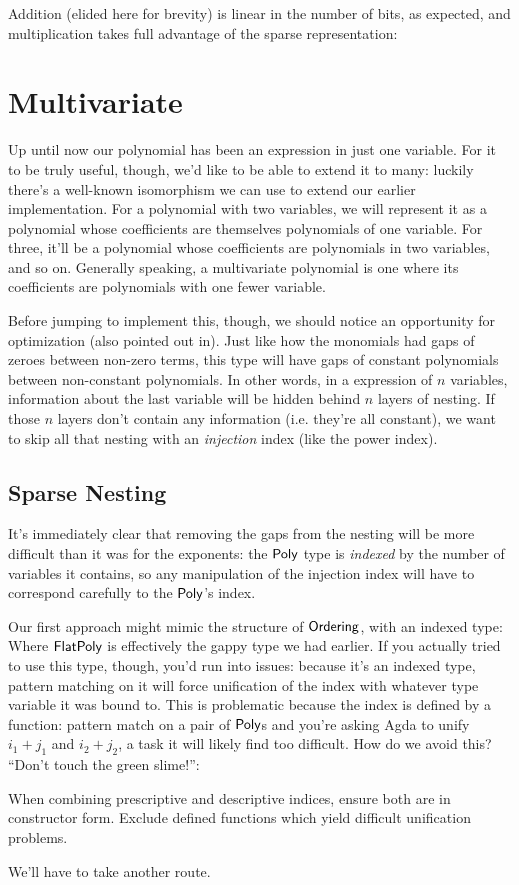 \documentclass[draft, twocolumn]{article}
\theoremstyle{definition}
\theoremstyle{remark}
\begin{document}
Addition (elided here for brevity) is linear in the number of bits, as expected,
and multiplication takes full advantage of the sparse representation:
\section{Multivariate}
Up until now our polynomial has been an expression in just one variable. For it
to be truly useful, though, we'd like to be able to extend it to many: luckily
there's a well-known isomorphism we can use to extend our earlier
implementation. For a polynomial with two variables, we will represent it as a
polynomial whose coefficients are themselves polynomials of one variable. For
three, it'll be a polynomial whose coefficients are polynomials in two
variables, and so on. Generally speaking, a multivariate polynomial is one where
its coefficients are polynomials with one fewer
variable\cite{cheng_functional_2018}.

Before jumping to implement this, though, we should notice an opportunity for
optimization (also pointed out in\cite{hutchison_proving_2005}). Just like how
the monomials had gaps of zeroes between non-zero terms, this type will have
gaps of constant polynomials between non-constant polynomials. In other words,
in a expression of \(n\) variables, information about the last variable will be
hidden behind \(n\) layers of nesting. If those \(n\) layers don't contain any
information (i.e. they're all constant), we want to skip all that nesting with
an \emph{injection} index (like the power index).
\subsection{Sparse Nesting}
It's immediately clear that removing the gaps from the nesting will be more
difficult than it was for the exponents: the \(\AgdaDatatype{Poly}\) type is
\emph{indexed} by the number of variables it contains, so any manipulation of
the injection index will have to correspond carefully to the
\(\AgdaDatatype{Poly}\)'s index.

Our first approach might mimic the structure of \(\AgdaDatatype{Ordering}\),
with an indexed type:
Where \(\AgdaDatatype{FlatPoly}\) is effectively the gappy type we had earlier.
If you actually tried to use this type, though, you'd run into issues: because
it's an indexed type, pattern matching on it will force unification of the index
with whatever type variable it was bound to. This is problematic because the
index is defined by a function: pattern match on a pair of
\(\AgdaDatatype{Poly}\)s and you're asking Agda to unify \(i_1 + j_1\) and
\(i_2 + j_2\), a task it will likely find too difficult. How do we avoid this?
``Don't touch the green slime!''\cite{mcbride_polynomial_2018}:
\begin{displayquote}
  When combining prescriptive and descriptive indices, ensure both are in
  constructor form. Exclude defined functions which yield difficult unification
  problems.
\end{displayquote}
We'll have to take another route.
\end{document}
